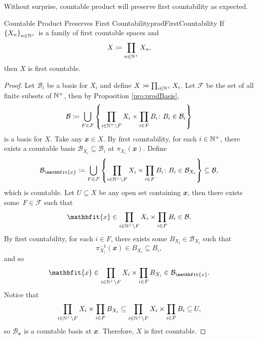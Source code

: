 \documentclass[math]{amznotes}
\theoremstyle{remark}
\begin{document}
Without surprise, countable product will preserve first countability as expected.
\begin{probox}{Countable Product Preserves First Countability}{prodFirstCountability}
    If $\left\{X_n\right\}_{n \in \mathbb{N}^+}$ is a family of first countable spaces and 
    \begin{equation*}
        X \coloneqq \prod_{n \in \mathbb{N}^+}X_n,
    \end{equation*}
    then $X$ is first countable.
    \tcblower
    \begin{proof}
        Let $\mathcal{B}_i$ be a basis for $X_i$ and define $X \coloneqq \prod_{i \in \mathbb{N}^+}X_i$. Let $\mathcal{F}$ be the set of all finite subsets of $\mathbb{N}^+$, then by Proposition \ref{pro:prodBasis},
        \begin{equation*}
            \mathcal{B} \coloneqq \bigcup_{F \in \mathcal{F}}\left\{\prod_{i \in \mathbb{N}^+ \setminus F}X_i \times \prod_{i \in F}B_i \colon B_i \in \mathcal{B}_i\right\}
        \end{equation*}
        is a basis for $X$. Take any $\mathbfit{x} \in X$. By first countability, for each $i \in \mathbb{N}^+$, there exists a countable basis $\mathcal{B}_{X_i} \subseteq \mathcal{B}_i$ at $\pi_{X_i}\left(\mathbfit{x}\right)$. Define
        \begin{equation*}
            \mathcal{B}_{\mathbfit{x}} \coloneqq \bigcup_{F \in \mathcal{F}}\left\{\prod_{i \in \N^+ \setminus F}X_i \times \prod_{i \in F}B_{i} \colon B_{i} \in \mathcal{B}_{X_i}\right\} \subseteq \mathcal{B},
        \end{equation*}
        which is countable. Let $U \subseteq X$ be any open set containing $\mathbfit{x}$, then there exists some~$F \in \mathcal{F}$ such that 
        \begin{equation*}
            \mathbfit{x} \in \prod_{i \in \N^+ \setminus F}X_i \times \prod_{i \in F}B_i \in \mathcal{B}.
        \end{equation*}
        By first countability, for each $i \in F$, there exists some $B_{X_i} \in \mathcal{B}_{X_i}$ such that 
        \begin{equation*}
            \pi_{X_i}^{-1}\left(\mathbfit{x}\right) \in B_{X_i} \subseteq B_i,
        \end{equation*}
        and so 
        \begin{equation*}
            \mathbfit{x} \in \prod_{i \in \N^+ \setminus F}X_i \times \prod_{i \in F}B_{X_i} \in \mathcal{B}_{\mathbfit{x}}.
        \end{equation*}
        Notice that 
        \begin{equation*}
            \prod_{i \in \mathbb{N}^+ \setminus F}X_i \times \prod_{i \in F}B_{X_i} \subseteq \prod_{i \in \mathbb{N}^+ \setminus F}X_i \times \prod_{i \in F}B_{i} \subseteq U,
        \end{equation*}
        so $\mathcal{B}_{\mathbfit{x}}$ is a countable basis at $\mathbfit{x}$. Therefore, $X$ is first countable.
    \end{proof}
\end{probox}
\end{document}
